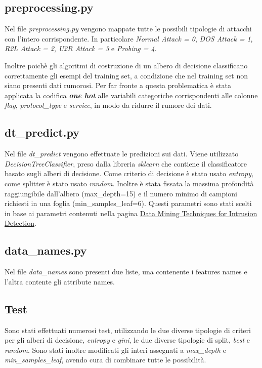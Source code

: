 \documentclass[a4paper,12pt]{article}
\begin{document}
\subsection{preprocessing.py}
Nel file \textit{preprocessing.py} vengono mappate tutte le possibili tipologie di attacchi con l'intero corrispondente. In particolare \textit{Normal Attack = 0}, \textit{DOS Attack = 1}, \textit{R2L Attack = 2}, \textit{U2R Attack = 3} e \textit{Probing = 4}.
\newline

Inoltre poichè gli algoritmi di costruzione di un albero di decisione classificano correttamente gli esempi del training set, a condizione che nel training set non siano presenti dati rumorosi. Per far fronte a questa problematica è stata applicata la codifica \textbf{\textit{one hot}} alle variabili categoriche corrispondenti alle colonne \textit{flag}, \textit{protocol\_type} e \textit{service}, in modo da ridurre il rumore dei dati.

\subsection{dt\_predict.py} 
Nel file \textit{dt\_predict} vengono effettuate le predizioni sui dati. 
\newline
Viene utilizzato \textit{DecisionTreeClassifier}, preso dalla libreria \textit{sklearn} che contiene il classificatore basato sugli alberi di decisione. Come criterio di decisione è stato usato \textit{entropy}, come splitter è stato usato \textit{random}. Inoltre è stata fissata la massima profondità raggiungibile dall'albero (max\_depth=15) e  il numero minimo di campioni richiesti in una foglia (min\_samples\_leaf=6). Questi parametri sono stati scelti in base ai parametri contenuti nella pagina \href{http://citeseerx.ist.psu.edu/viewdoc/download?doi=10.1.1.122.5800&rep=rep1&type=pdf}{Data Mining Techniques for Intrusion Detection}.

\subsection{data\_names.py} 
Nel file \textit{data\_names} sono presenti due liste, una contenente i features names e l'altra contente gli attribute names.

\subsection{Test}
Sono stati effettuati numerosi test, utilizzando le due diverse tipologie di criteri per gli alberi di decisione, \textit{entropy} e \textit{gini}, le due diverse tipologie di split,  \textit{best} e \textit{random}. Sono stati inoltre modificati gli interi assegnati a \textit{max\_depth} e \textit{min\_samples\_leaf}, avendo cura di combinare tutte le possibilità. 
\end{document}
